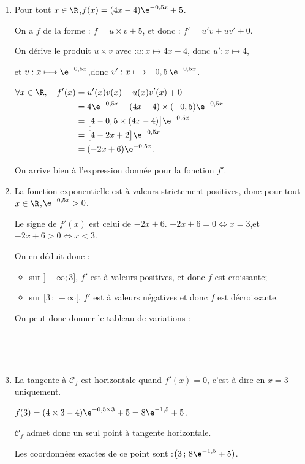 \begin{enumerate}
		\item Pour tout $x\in\R$,\quad $f(x)=(4x-4)\e^{-0,5x}+5$.

		On a $f$ de la forme : \quad $f = u \times v + 5$, \quad et donc : $f'=u'v + uv' + 0$.

		On dérive le produit $u\times v$ avec :\quad $u : x\longmapsto 4x-4$, \quad donc \quad $u': x \longmapsto 4$,

		et \quad $v : x\longmapsto \e^{-0,5x}$,\quad donc \quad $v':x\longmapsto -0,5\,\e^{-0,5x}$.

		$\forall x \in \R,\quad \begin{aligned}[t]
			f'(x)&=u'(x)v(x)+u(x)v'(x) + 0\\
			&=4\e^{-0,5x}+(4x-4)\times(-0,5)\e^{-0,5x}\\
			&=\big[4-0,5\times(4x-4)\big]\e^{-0,5x}\\
			&=\big[4-2x+2\big]\e^{-0,5x}\\
			&=(-2x+6)\e^{-0,5x}.
		\end{aligned}$

		On arrive bien à l'expression donnée pour la fonction $f'$.

		\item La fonction exponentielle est à valeurs strictement positives, donc pour tout $x\in\R$,\quad $\e^{-0,5x}>0$.

		Le signe de $f'(x)$ est celui de $-2x+6$.
		$-2x+6=0\Longleftrightarrow x=3$,\quad et \quad $-2x+6>0\Longleftrightarrow x<3$.

		On en déduit donc :
		\begin{itemize}[left=5mm,label={\textbullet~} ]
			\item sur $]-\infty ; 3]$, $f'$ est à valeurs positives, et donc $f$ est croissante;

			\item sur $[3\,;\,+\infty[$, $f'$ est à valeurs négatives et donc $f$ est décroissante.
		\end{itemize}

		On peut donc donner le tableau de variations :

		\hfill~\hfill~

		\item La tangente à $\mathcal{C}_{f}$ est horizontale quand $f'(x)=0$, c'est-à-dire en $x=3$ uniquement.

		$f(3)=(4\times 3-4)\e^{-0,5\times 3}+5=8\e^{-1,5}+5$.

		$\mathcal{C}_{f}$ admet donc un seul point à tangente horizontale.

		Les coordonnées exactes de ce point sont :\quad $\left(3\,;\,8\e^{-1,5}+5\right)$.
	\end{enumerate}
